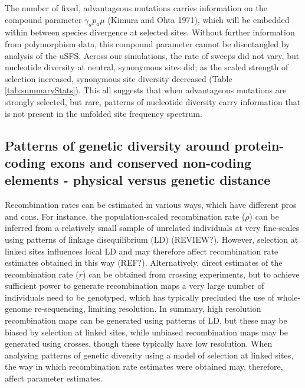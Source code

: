 \documentclass[11pt]{article}
\begin{document}
	The number of fixed, advantageous mutations carries information on the compound parameter $\gamma_a p_a \mu$ (Kimura and Ohta 1971), which will be embedded within between species divergence at selected sites. Without further information from polymorphism data, this compound parameter cannot be disentangled by analysis of the uSFS. Across our simulations, the rate of sweeps did not vary, but nucleotide diversity at neutral, synonymous sites did; as the scaled strength of selection increased, synonymous site diversity decreased (Table \ref{tab:summaryStats}). This all suggests that when advantageous mutations are strongly selected, but rare, patterns of nucleotide diversity carry information that is not present in the unfolded site frequency spectrum.

\subsection*{Patterns of genetic diversity around protein-coding exons and conserved non-coding elements - physical versus genetic distance}

\begin{figure}[h]
   \centering      
   \noindent{}
 \caption[The ]
 
 \label{fig:1}
\end{figure}

	Recombination rates can be estimated in various ways, which have different pros and cons. For instance, the population-scaled recombination rate ($\rho$) can be inferred from a relatively small sample of unrelated individuals at very fine-scales using patterns of linkage disequilibrium (LD) (REVIEW?). However, selection at linked sites influences local LD and may therefore affect recombination rate estimates obtained in this way (REF?). Alternatively, direct estimates of the recombination rate ($r$) can be obtained from crossing experiments, but to achieve sufficient power to generate recombination maps a very large number of individuals need to be genotyped, which has typically precluded the use of whole-genome re-sequencing, limiting resolution. In summary, high resolution recombination maps can be generated using patterns of LD, but these may be biased by selection at linked sites, while unbiased recombination maps may be generated using crosses, though these typically have low resolution. When analysing patterns of genetic diversity using a model of selection at linked sites, the way in which recombination rate estimates were obtained may, therefore, affect parameter estimates.
\end{document}
